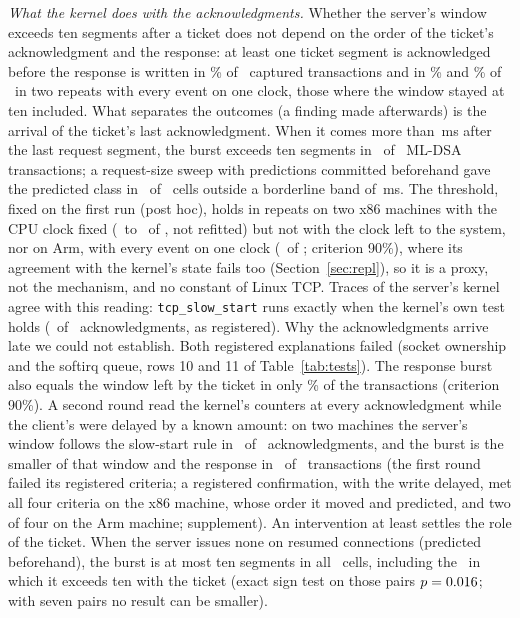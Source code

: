 \documentclass[sigconf,9pt,nonacm]{acmart}
\newcommand{\ms}{\,ms\xspace}
\begin{document}
\emph{What the kernel does with the acknowledgments.} Whether the server's window exceeds ten segments after a ticket does not depend on the order of the ticket's acknowledgment and the response: at least one ticket segment is acknowledged before the response is written in \RaceBeforePct\% of \RaceN\ captured transactions and in \RqKSixPct\% and \RpKSixPct\% of \RpKSixN\ in two repeats with every event on one clock, those where the window stayed at ten included. What separates the outcomes (a finding made afterwards) is the arrival of the ticket's last acknowledgment. When it comes more than \RaceThr\ms after the last request segment, the burst exceeds ten segments in \RaceRight\ of \RaceMlN\ ML-DSA transactions; a request-size sweep with predictions committed beforehand gave the predicted class in \RaceTwoRight\ of \RaceTwoScored\ cells outside a borderline band of \RaceBand\ms. The threshold, fixed on the first run (post hoc), holds in repeats on two x86 machines with the CPU clock fixed (\RpKSevenRight\ to \RqKSevenRight\ of \RoKSevenN, not refitted) but not with the clock left to the system, nor on Arm, with every event on one clock (\RgKSevenRight\ of \RgKSevenN; criterion 90\%), where its agreement with the kernel's state fails too (Section~\ref{sec:repl}), so it is a proxy, not the mechanism, and no constant of Linux TCP. Traces of the server's kernel agree with this reading: \texttt{tcp\_slow\_start} runs exactly when the kernel's own test holds (\StPOneRight\ of \StPOneN\ acknowledgments, as registered). Why the acknowledgments arrive late we could not establish. Both registered explanations failed (socket ownership and the softirq queue, rows 10 and 11 of Table~\ref{tab:tests}). The response burst also equals the window left by the ticket in only \StPTwoPct\% of the transactions (criterion 90\%). A second round read the kernel's counters at every acknowledgment while the client's were delayed by a known amount: on two machines the server's window follows the slow-start rule in \RbEvOk\ of \RbEvN\ acknowledgments, and the burst is the smaller of that window and the response in \RbTxOk\ of \RbTxN\ transactions (the first round failed its registered criteria; a registered confirmation, with the write delayed, met all four criteria on the x86 machine, whose order it moved and predicted, and two of four on the Arm machine; supplement). An intervention at least settles the role of the ticket. When the server issues none on resumed connections (predicted beforehand), the burst is at most ten segments in all \NtkCells\ cells, including the \NtkEffect\ in which it exceeds ten with the ticket (exact sign test on those pairs $p=0.016$; with seven pairs no result can be smaller).
\end{document}
